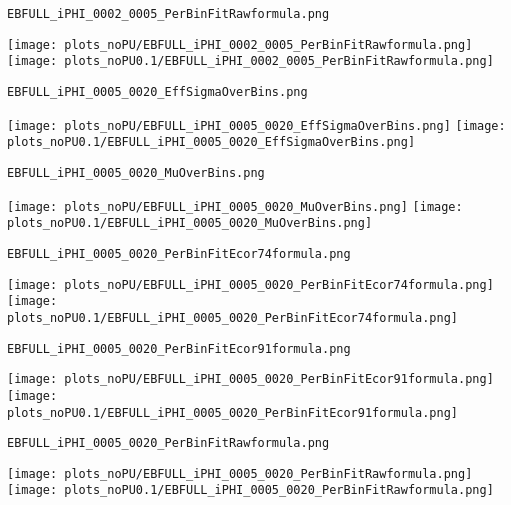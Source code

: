 \begin{frame}[fragile]
\begin{verbatim}
EBFULL_iPHI_0002_0005_PerBinFitRawformula.png
\end{verbatim}
\texttt{[image: plots\_noPU/EBFULL\_iPHI\_0002\_0005\_PerBinFitRawformula.png]}
\texttt{[image: plots\_noPU0.1/EBFULL\_iPHI\_0002\_0005\_PerBinFitRawformula.png]}
\end{frame}
\begin{frame}[fragile]
\begin{verbatim}
EBFULL_iPHI_0005_0020_EffSigmaOverBins.png
\end{verbatim}
\texttt{[image: plots\_noPU/EBFULL\_iPHI\_0005\_0020\_EffSigmaOverBins.png]}
\texttt{[image: plots\_noPU0.1/EBFULL\_iPHI\_0005\_0020\_EffSigmaOverBins.png]}
\end{frame}
\begin{frame}[fragile]
\begin{verbatim}
EBFULL_iPHI_0005_0020_MuOverBins.png
\end{verbatim}
\texttt{[image: plots\_noPU/EBFULL\_iPHI\_0005\_0020\_MuOverBins.png]}
\texttt{[image: plots\_noPU0.1/EBFULL\_iPHI\_0005\_0020\_MuOverBins.png]}
\end{frame}
\begin{frame}[fragile]
\begin{verbatim}
EBFULL_iPHI_0005_0020_PerBinFitEcor74formula.png
\end{verbatim}
\texttt{[image: plots\_noPU/EBFULL\_iPHI\_0005\_0020\_PerBinFitEcor74formula.png]}
\texttt{[image: plots\_noPU0.1/EBFULL\_iPHI\_0005\_0020\_PerBinFitEcor74formula.png]}
\end{frame}
\begin{frame}[fragile]
\begin{verbatim}
EBFULL_iPHI_0005_0020_PerBinFitEcor91formula.png
\end{verbatim}
\texttt{[image: plots\_noPU/EBFULL\_iPHI\_0005\_0020\_PerBinFitEcor91formula.png]}
\texttt{[image: plots\_noPU0.1/EBFULL\_iPHI\_0005\_0020\_PerBinFitEcor91formula.png]}
\end{frame}
\begin{frame}[fragile]
\begin{verbatim}
EBFULL_iPHI_0005_0020_PerBinFitRawformula.png
\end{verbatim}
\texttt{[image: plots\_noPU/EBFULL\_iPHI\_0005\_0020\_PerBinFitRawformula.png]}
\texttt{[image: plots\_noPU0.1/EBFULL\_iPHI\_0005\_0020\_PerBinFitRawformula.png]}
\end{frame}
